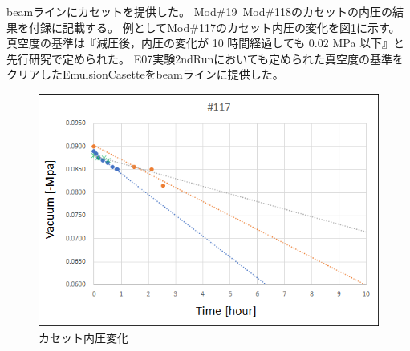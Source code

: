 \documentclass[12pt,a4paper]{jarticle}
\begin{document}
beamラインにカセットを提供した。
Mod$\#$19~Mod$\#$118のカセットの内圧の結果を付録に記載する。
例としてMod$\#$117のカセット内圧の変化を図\ref{fig:casette_bakyu-mu}に示す。
真空度の基準は『減圧後，内圧の変化が 10 時間経過しても 0.02 MPa 以下』と先行研究で定められた。\cite{endo}
E07実験2ndRunにおいても定められた真空度の基準をクリアしたEmulsionCasetteをbeamラインに提供した。
\begin{figure}[htbp]
  \centering
     \includegraphics[width=140mm]{vacuum117.png}
  \caption{カセット内圧変化\label{fig:casette_bakyu-mu}}
\end{figure}
\end{document}
